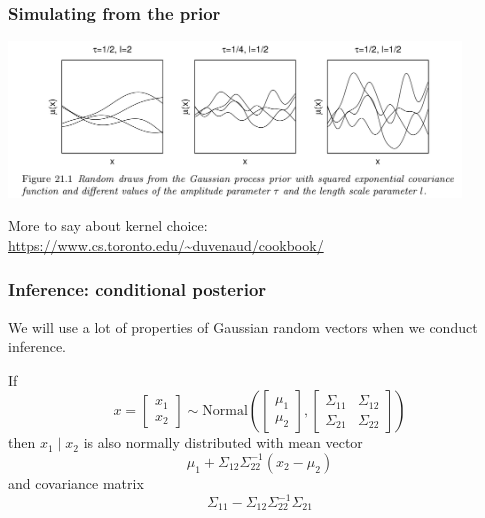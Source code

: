 \documentclass{beamer}
\begin{document}
\begin{frame}
\frametitle{Simulating from the prior}


\begin{center}
\includegraphics[width=120mm]{mu_realizations.png}
\end{center}

More to say about kernel choice: \url{https://www.cs.toronto.edu/~duvenaud/cookbook/}


\end{frame}
\begin{frame}
\frametitle{Inference: conditional posterior}

We will use a lot of properties of Gaussian random vectors when we conduct inference.
\newline

If 
$$
x = 
\left[\begin{array}{c}
x_1 \\
x_2
\end{array}\right]
\sim
\text{Normal}\left( 
\left[\begin{array}{c}
\mu_1 \\
\mu_2
\end{array}\right],
\left[\begin{array}{cc}
\Sigma_{11} & \Sigma_{12} \\
\Sigma_{21} & \Sigma_{22} 
\end{array}\right]
\right)
$$
then $x_1 \mid x_2$ is also normally distributed with mean vector
$$
\mu_1 + \Sigma_{12}\Sigma_{22}^{-1}(x_2 - \mu_2)
$$
and covariance matrix
$$
\Sigma_{11} - \Sigma_{12}\Sigma_{22}^{-1}\Sigma_{21}
$$


\end{frame}
\end{document}

